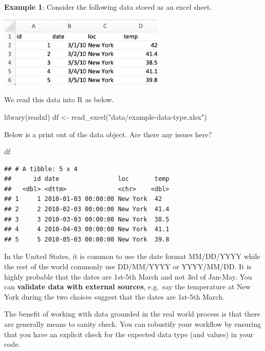 \documentclass[
]{book}
\newenvironment{Shaded}{\begin{snugshade}}{\end{snugshade}}
\newcommand{\FunctionTok}[1]{\textcolor[rgb]{0.00,0.00,0.00}{#1}}
\newcommand{\NormalTok}[1]{#1}
\newcommand{\OtherTok}[1]{\textcolor[rgb]{0.56,0.35,0.01}{#1}}
\newcommand{\StringTok}[1]{\textcolor[rgb]{0.31,0.60,0.02}{#1}}
\begin{document}
\textbf{Example 1}: Consider the following data stored as an excel sheet.

\includegraphics[width=300px]{images/example-data-type}

We read this data into R as below.

\begin{Shaded}
\begin{Highlighting}[]
\FunctionTok{library}\NormalTok{(readxl)}
\NormalTok{df }\OtherTok{\textless{}{-}} \FunctionTok{read\_excel}\NormalTok{(}\StringTok{"data/example{-}data{-}type.xlsx"}\NormalTok{)}
\end{Highlighting}
\end{Shaded}

Below is a print out of the data object. Are there any issues here?

\begin{Shaded}
\begin{Highlighting}[]
\NormalTok{df}
\end{Highlighting}
\end{Shaded}

\begin{verbatim}
## # A tibble: 5 x 4
##      id date                loc       temp
##   <dbl> <dttm>              <chr>    <dbl>
## 1     1 2010-01-03 00:00:00 New York  42  
## 2     2 2010-02-03 00:00:00 New York  41.4
## 3     3 2010-03-03 00:00:00 New York  38.5
## 4     4 2010-04-03 00:00:00 New York  41.1
## 5     5 2010-05-03 00:00:00 New York  39.8
\end{verbatim}

In the United States, it is common to use the date format MM/DD/YYYY while the rest of the world commonly use DD/MM/YYYY or YYYY/MM/DD. It is highly probable that the dates are 1st-5th March and not 3rd of Jan-May. You can \textbf{validate data with external sources}, e.g.~say the temperature at New York during the two choices suggest that the dates are 1st-5th March.

The benefit of working with data grounded in the real world process is that there are generally means to sanity check. You can robustify your workflow by ensuring that you have an explicit check for the expected data type (and values) in your code.
\end{document}
